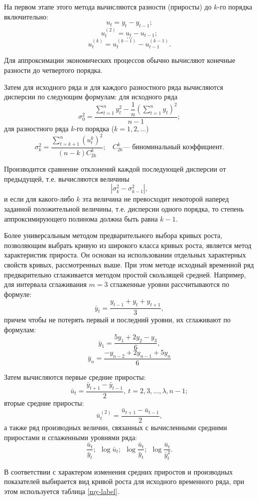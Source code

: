 На первом этапе этого метода вычисляются разности (приросты) до $k$-го порядка включительно:
\[ u_t =y_t - y_{t-1};\]
\[ u_t^{(2)} =u_t - u_{t-1}; \]
\[ \dots \]
\[u_t^{(k)} =u_t^{(k-1)} - u_{t-1}^{(k-1)}. \]

Для аппроксимации экономических процессов обычно вычисляют конечные разности до четвертого порядка.

Затем для исходного ряда и для каждого разностного ряда вычисляются дисперсии по следующим формулам: для исходного ряда
\[ \sigma_0^2 = \dfrac{\sum\limits_{t=1}^{n}y_t^2 - \dfrac{1}{n}\left(\sum\limits_{t=1}^{n}y_t\right)^2}{n-1}; \]
для разностного ряда $k$-го порядка ($k = 1, 2,...$)
\[ \sigma_k^2 =\dfrac{\sum\limits_{t=k+1}^{n}(u_t^k)^2}{(n-k)C_{2k}^k}; \ \ \ \ C_{2k}^k \text{--- биноминальный коэффициент.} \]

Производится сравнение отклонений каждой последующей дисперсии от предыдущей, т.е. вычисляются величины
\[ |\sigma_k^2 - \sigma_{k-1}^2|, \]
и если для какого-либо $k$ эта величина не превосходит некоторой наперед заданной положительной величины, т.е. дисперсии одного порядка, то степень аппроксимирующего полинома должна быть равна $k - 1$.

Более универсальным методом предварительного выбора кривых роста, позволяющим выбрать кривую из широкого класса кривых роста, является метод характеристик прироста. Он основан на использовании отдельных характерных свойств кривых, рассмотренных выше. При этом методе исходный временной ряд предварительно сглаживается методом простой скользящей средней. Например, для интервала сглаживания $m = 3$ сглаженные уровни рассчитываются по формуле:
\[ \bar{y}_t = \dfrac{y_{t-1} + y_t + y_{t+1}}{3}, \]
причем чтобы не потерять первый и последний уровни, их сглаживают по формулам:
\[ \bar{y}_1 = \dfrac{5y_{1} + 2y_2 - y_{3}}{6}, \]
\[ \bar{y}_n = \dfrac{-y_{n-2} + 2y_{n-1} + 5y_{n}}{6} \]

Затем вычисляются первые средние приросты:
\[ \bar{u}_t = \dfrac{\bar{y}_{t+1} - \bar{y}_{t-1}}{2},\ t=2,3,...,\lambda,n-1; \]
вторые средние приросты:
 \[ \bar{u}_t^{(2)} = \dfrac{\bar{u}_{t+1} - \bar{u}_{t-1}}{2}, \]
 а также ряд производных величин, связанных с вычисленными средними приростами и сглаженными уровнями ряда:
\[ \frac{\bar{u}_t}{\bar{y}_t};\ \ \log \bar{u}_t;\ \ \log \dfrac{\bar{u}_t}{\bar{y}_t};\ \ \log \dfrac{\bar{u}_t}{\bar{y}_t^2}. \]

В соответствии с характером изменения средних приростов и производных показателей выбирается вид кривой роста для исходного временного ряда, при этом используется таблица \ref{my-label}.

